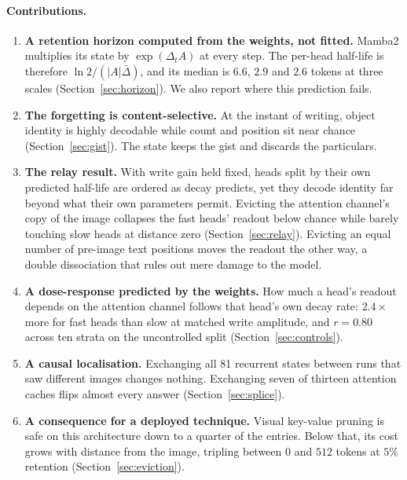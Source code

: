 \documentclass{article}
\begin{document}
\paragraph{Contributions.}
\begin{enumerate}\setlength{\itemsep}{1pt}\setlength{\parskip}{0pt}
\item \textbf{A retention horizon computed from the weights, not fitted.}
Mamba2 multiplies its state by $\exp(\Delta_t A)$ at every step. The per-head
half-life is therefore $\ln 2/(|A|\bar{\Delta})$, and its median is $6.6$,
$2.9$ and $2.6$ tokens at three scales (Section~\ref{sec:horizon}). We also
report where this prediction fails.
\item \textbf{The forgetting is content-selective.} At the instant of writing,
object identity is highly decodable while count and position sit near chance
(Section~\ref{sec:gist}). The state keeps the gist and discards the
particulars.
\item \textbf{The relay result.} With write gain held fixed, heads split by
their own predicted half-life are ordered as decay predicts, yet they decode
identity far beyond what their own parameters permit. Evicting the attention
channel's copy of the image collapses the fast heads' readout below chance
while barely touching slow heads at distance zero (Section~\ref{sec:relay}).
Evicting an equal number of pre-image text positions moves the readout the
other way, a double dissociation that rules out mere damage to the model.
\item \textbf{A dose-response predicted by the weights.} How much a head's
readout depends on the attention channel follows that head's own decay rate:
$2.4\times$ more for fast heads than slow at matched write amplitude, and
$r = 0.80$ across ten strata on the uncontrolled split
(Section~\ref{sec:controls}).
\item \textbf{A causal localisation.} Exchanging all 81 recurrent states
between runs that saw different images changes nothing. Exchanging seven of
thirteen attention caches flips almost every answer
(Section~\ref{sec:splice}).
\item \textbf{A consequence for a deployed technique.} Visual key-value
pruning is safe on this architecture down to a quarter of the entries. Below
that, its cost grows with distance from the image, tripling between $0$ and
$512$ tokens at $5\%$ retention (Section~\ref{sec:eviction}).
\end{enumerate}
\end{document}
